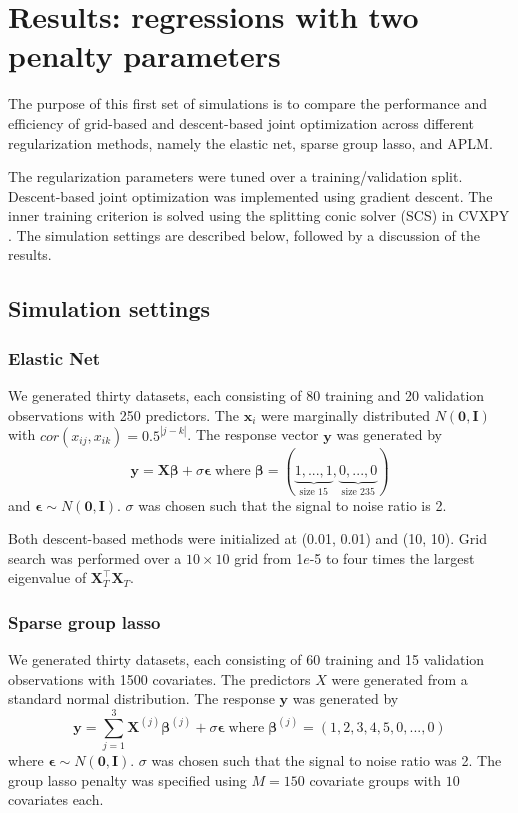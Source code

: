 \documentclass{statsoc}
\begin{document}
\section{Results: regressions with two penalty parameters}\label{sec:results1}\label{results1}

The purpose of this first set of simulations is to compare the performance and efficiency of grid-based and descent-based joint optimization across different regularization methods, namely the elastic net, sparse group lasso, and APLM.

The regularization parameters were tuned over a training/validation split. Descent-based joint optimization was implemented using gradient descent. The inner training criterion is solved using the splitting conic solver (SCS) in CVXPY \citep{cvxpy}. The simulation settings are described below, followed by a discussion of the results.

\subsection{Simulation settings}
\subsubsection{Elastic Net}
We generated thirty datasets, each consisting of 80 training and 20 validation observations with 250 predictors. The $\boldsymbol x_i$ were marginally distributed $N(\boldsymbol 0,\boldsymbol I)$ with $cor(x_{ij},x_{ik}) = 0.5^{|j-k|}$.
The response vector $\boldsymbol y$ was generated by
\begin{equation}
\boldsymbol y = \boldsymbol X \boldsymbol \beta + \sigma \boldsymbol \epsilon \; \text{where} \; \boldsymbol \beta = (\underbrace{1, ..., 1}_\text{size 15}, \underbrace{0, ..., 0}_\text{size 235})
\end{equation}
and $\boldsymbol \epsilon \sim N(\boldsymbol 0, \boldsymbol I)$. $\sigma$ was chosen such that the signal to noise ratio is 2. 

Both descent-based methods were initialized at (0.01, 0.01) and (10, 10). Grid search was performed over a $10 \times 10$ grid from 1$e$-5 to four times the largest eigenvalue of $\boldsymbol X_T^\top \boldsymbol X_T$.

\subsubsection{Sparse group lasso}\label{sec:simulation_sgl}
We generated thirty datasets, each consisting of 60 training and 15 validation observations with 1500 covariates. The predictors $X$ were generated from a standard normal distribution. The response $\boldsymbol y$ was generated by
\begin{equation}
\boldsymbol y = \sum\limits_{j=1}^3 \boldsymbol X^{(j)} \boldsymbol \beta^{(j)} + \sigma \boldsymbol \epsilon \; \text{where} \; \boldsymbol \beta^{(j)} = (1, 2, 3, 4, 5, 0, ..., 0)
\end{equation}
where $\boldsymbol \epsilon \sim N(\boldsymbol 0, \boldsymbol I)$. $\sigma$ was chosen such that the signal to noise ratio was 2. The group lasso penalty was specified using $M=150$ covariate groups with $10$ covariates each.
\end{document}

